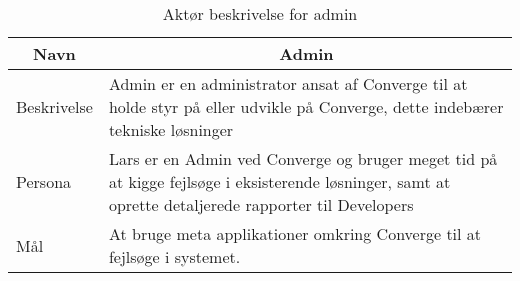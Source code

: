 \begin{table}[H]
    \begin{small}
        \caption{Aktør beskrivelse for admin}
        \label{tab:admin}
        \begin{center}
            \begin{tabular}[c]{p{3cm}|p{8cm}}
                \multicolumn{1}{c|}{\textbf{Navn}} & \multicolumn{1}{c}{\textbf{Admin}}                                                                                                                                              \\
                \hline
                Beskrivelse                        & \multicolumn{1}{p{10cm}}{Admin er en administrator ansat af Converge til at holde styr på eller udvikle på Converge, dette indebærer tekniske løsninger}                        \\
                \hline
                Persona                            & \multicolumn{1}{p{10cm}}{Lars er en Admin ved Converge og bruger meget tid på at kigge fejlsøge i eksisterende løsninger, samt at oprette detaljerede rapporter til Developers} \\
                \hline
                Mål                                & \multicolumn{1}{p{10cm}}{At bruge meta applikationer omkring Converge til at fejlsøge i systemet.}                                                                              \\
            \end{tabular}
        \end{center}
    \end{small}
\end{table}

